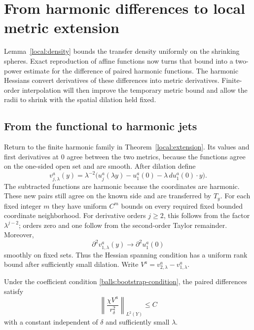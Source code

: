 \section{From harmonic differences to local metric extension}\label{sec:bootstrap}

Lemma~\ref{local:density} bounds the transfer density uniformly on the
shrinking spheres.  Exact reproduction of affine functions now turns that
bound into a two-power estimate for the difference of paired harmonic
functions.  The harmonic Hessians convert derivatives of these differences
into metric derivatives.  Finite-order interpolation will then improve
the temporary metric bound and allow the radii to shrink with the spatial
dilation held fixed.

\subsection{From the functional to harmonic jets}

Return to the finite harmonic family in Theorem~\ref{local:extension}.
Its values and first derivatives at $0$ agree between the two metrics,
because the functions agree on the one-sided open set and are smooth.
After dilation define
\begin{equation}\label{local:renormalized-pairs}
 v_{j,\lambda}^a(y)=\lambda^{-2}
 \bigl(u_j^a(\lambda y)-u_1^a(0)
                     -\lambda\,du_1^a(0)\cdot y\bigr).
\end{equation}
The subtracted functions are harmonic because the coordinates are
harmonic.  These new pairs still agree on the known side and are
transferred by $T_y$.  For each fixed integer $m$ they have uniform
$C^m$ bounds on every required fixed bounded coordinate neighborhood.
For derivative orders $j\geq2$, this follows from the factor
$\lambda^{j-2}$; orders zero and one follow from the second-order
Taylor remainder.  Moreover,
\[
 \partial^2v_{1,\lambda}^a(y)\longrightarrow\partial^2u_1^a(0)
\]
smoothly on fixed sets.  Thus the Hessian spanning condition has a
uniform rank bound after sufficiently small dilation.  Write
$V^a=v_{2,\lambda}^a-v_{1,\lambda}^a$.

\begin{lemma}\label{local:moment}
Under the coefficient condition \eqref{balls:bootstrap-condition},
the paired differences satisfy
\begin{equation}\label{local:moment-bound}
 \left\|\frac{\chi V^a}{r_\delta^2}\right\|_{L^2(Y)}\leq C
\end{equation}
with a constant independent of $\delta$ and sufficiently small
$\lambda$.
\end{lemma}

